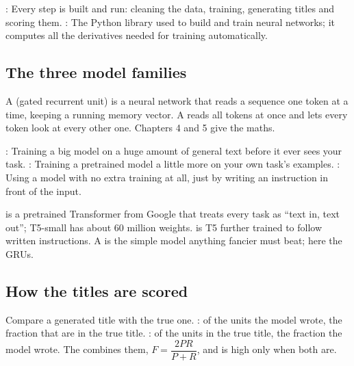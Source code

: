 \begin{definition}
: Every step is built and run: cleaning the data, training, generating titles and scoring them. : The Python library used to build and train neural networks; it computes all the derivatives needed for training automatically.
\end{definition}

\subsection*{The three model families}

\begin{definition}
A  (gated recurrent unit) is a neural network that reads a sequence one token at a time, keeping a running memory vector. A  reads all tokens at once and lets every token look at every other one. Chapters 4 and 5 give the maths.
\end{definition}

\begin{definition}
: Training a big model on a huge amount of general text before it ever sees your task. : Training a pretrained model a little more on your own task's examples. : Using a model with no extra training at all, just by writing an instruction in front of the input.
\end{definition}

\begin{definition}
 is a pretrained Transformer from Google that treats every task as ``text in, text out''; T5-small has about 60 million weights.  is T5 further trained to follow written instructions. A  is the simple model anything fancier must beat; here the GRUs.
\end{definition}

\subsection*{How the titles are scored}

\begin{definition}
Compare a generated title with the true one. : of the units the model wrote, the fraction that are in the true title. : of the units in the true title, the fraction the model wrote. The  combines them, $F = \dfrac{2PR}{P + R}$, and is high only when both are.
\end{definition}

